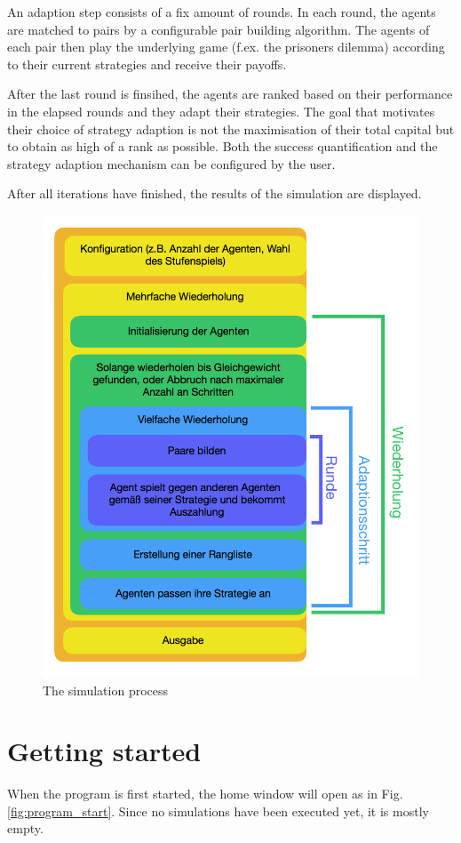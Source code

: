 \documentclass[parskip=full,11pt]{scrartcl}
\begin{document}
An adaption step consists of a fix amount of rounds. In each round, the agents are matched to pairs by a configurable pair building algorithm. The agents of each pair then play the underlying game (f.ex. the prisoners dilemma) according to their current strategies and receive their payoffs.

After the last round is finsihed, the agents are ranked based on their performance in the elapsed rounds and they adapt their strategies. The goal that motivates their choice of strategy adaption is not the maximisation of their total capital but to obtain as high of a rank as possible. Both the success quantification and the strategy adaption mechanism can be configured by the user.

After all iterations have finished, the results of the simulation are displayed.

\begin{figure}
	\centering
	\includegraphics[width=0.9\linewidth]{img_manual/Schema.png}
	\caption{The simulation process}
	\label{fig:simulation_process}
\end{figure}

\pagebreak
\section{Getting started}
When the program is first started, the home window will open as in Fig. \ref{fig:program_start}. Since no simulations have been executed yet, it is mostly empty.
\end{document}
